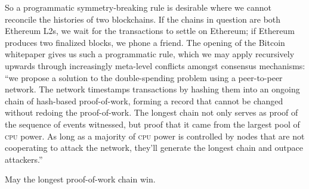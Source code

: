 \documentclass[twoside]{article}
\begin{document}
So a programmatic symmetry-breaking rule is desirable where we cannot
reconcile the histories of two blockchains. If the chains in question
are both Ethereum L2s, we wait for the transactions to settle on
Ethereum; if Ethereum produces two finalized blocks, we phone a friend.
The opening of the Bitcoin whitepaper gives us such a programmatic rule,
which we may apply recursively upwards through increasingly meta-level
conflicts amongst consensus mechanisms: ``we propose a solution to the
double-spending problem using a peer-to-peer network. The network
timestamps transactions by hashing them into an ongoing chain of
hash-based proof-of-work, forming a record that cannot be changed
without redoing the proof-of-work. The longest chain not only serves as
proof of the sequence of events witnessed, but proof that it came from
the largest pool of \textsc{cpu} power. As long as a majority of \textsc{cpu} power is
controlled by nodes that are not cooperating to attack the network,
they'll generate the longest chain and outpace attackers.''

May the longest proof-of-work chain win.

\printbibliography
\end{document}
